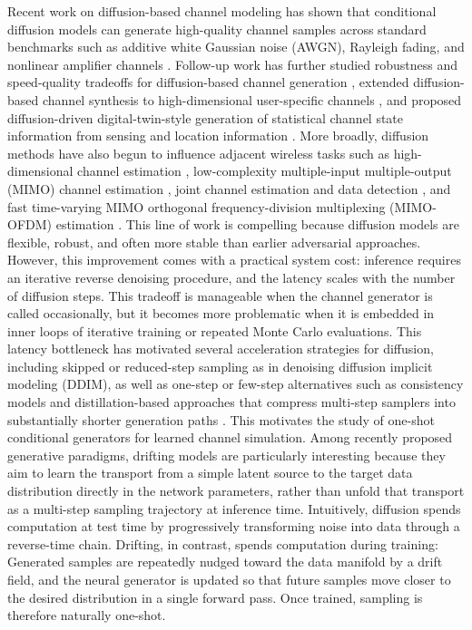\documentclass[conference]{IEEEtran}
\begin{document}
Recent work on diffusion-based channel modeling has shown that conditional diffusion models can generate high-quality channel samples across standard benchmarks such as additive white Gaussian noise (AWGN), Rayleigh fading, and nonlinear amplifier channels \cite{paper2309}.
Follow-up work has further studied robustness and speed-quality tradeoffs for diffusion-based channel generation \cite{kimicc2024}, extended diffusion-based channel synthesis to high-dimensional user-specific channels \cite{lee2024highdimchannels}, and proposed diffusion-driven digital-twin-style generation of statistical channel state information from sensing and location information \cite{gong2025dtoc}.
More broadly, diffusion methods have also begun to influence adjacent wireless tasks such as high-dimensional channel estimation \cite{zhou2025channelestimation}, low-complexity multiple-input multiple-output (MIMO) channel estimation \cite{fesl2024mimoestimation,chen2025mimovi}, joint channel estimation and data detection \cite{zilberstein2024joint}, and fast time-varying MIMO orthogonal frequency-division multiplexing (MIMO-OFDM) estimation \cite{liu2025mimoofdm}.
This line of work is compelling because diffusion models are flexible, robust, and often more stable than earlier adversarial approaches.
However, this improvement comes with a practical system cost: inference requires an iterative reverse denoising procedure, and the latency scales with the number of diffusion steps.
This tradeoff is manageable when the channel generator is called occasionally, but it becomes more problematic when it is embedded in inner loops of iterative training or repeated Monte Carlo evaluations. This latency bottleneck has motivated several acceleration strategies for diffusion, including skipped or reduced-step sampling as in denoising diffusion implicit modeling (DDIM), as well as one-step or few-step alternatives such as consistency models and distillation-based approaches that compress multi-step samplers into substantially shorter generation paths \cite{ddim,song2023consistency,yin2024onestep}.
This motivates the study of one-shot conditional generators for learned channel simulation.
Among recently proposed generative paradigms, drifting models \cite{drifting} are particularly interesting because they aim to learn the transport from a simple latent source to the target data distribution directly in the network parameters, rather than unfold that transport as a multi-step sampling trajectory at inference time.
Intuitively, diffusion spends computation at test time by progressively transforming noise into data through a reverse-time chain.
Drifting, in contrast, spends computation during training: Generated samples are repeatedly nudged toward the data manifold by a drift field, and the neural generator is updated so that future samples move closer to the desired distribution in a single forward pass.
Once trained, sampling is therefore naturally one-shot.
\end{document}
